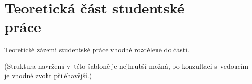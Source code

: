 \chapter[Teoretická část studentské práce]{Teoretická část studentské\\ práce}

Teoretické zázemí studentské práce vhodně rozdělené do částí.

(Struktura navržená v~této šabloně je nejhrubší možná, po konzultaci s~vedoucím je vhodné zvolit přiléhavější.)
